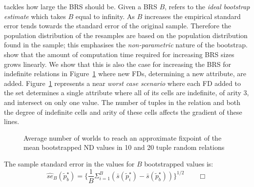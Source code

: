 \cite{et93} tackles how large the BRS should be. Given a BRS $B$, \cite{et93}
refers to the {\em ideal bootstrap estimate} which takes $B$ equal to
infinity. As $B$ increases the empirical standard error tends towards
the standard error of the original sample. Therefore the population
distribution of
the resamples are based on the population distribution found in the
sample; this emphasises the {\em non-parametric} nature of the bootstrap.
\cite{et93} show that the amount of computation time required for increasing
BRS sizes grows linearly. We show that this is also the case for 
increasing the BRS for indefinite relations in Figure~\ref{graph:linboot}
where new FDs, determining a new attribute, are added.
Figure~\ref{graph:linboot} represents a near {\em worst case scenario}
where each FD added to the 
set determines a single attribute where all of its cells are indefinite, of
arity 3, and intersect on only one value. The number of tuples in the
relation and both the degree of indefinite cells and arity of these
cells affects the gradient of these lines.


\begin{figure}
\centerline{}
\caption{\label{graph:linboot} {Average number of worlds to
reach an approximate fixpoint of the mean bootstrapped ND values in 10
and 20 tuple random relations}}
\end{figure}

\begin{definition}
\begin{rm}
The sample standard error in the values for $B$ bootstrapped
values is:
\begin{displaymath}
\hat{se}_B(\tilde{p}^\star_b) = \{ \frac{1}{B}\Sigma_{i = 1}^{B}(\bar{s}(\tilde{p}^\star_i) - \bar{s}(\tilde{p}^\star_b)) \}^{1/2}\quad\quad\Box
\end{displaymath}
\end{rm}
\end{definition}

